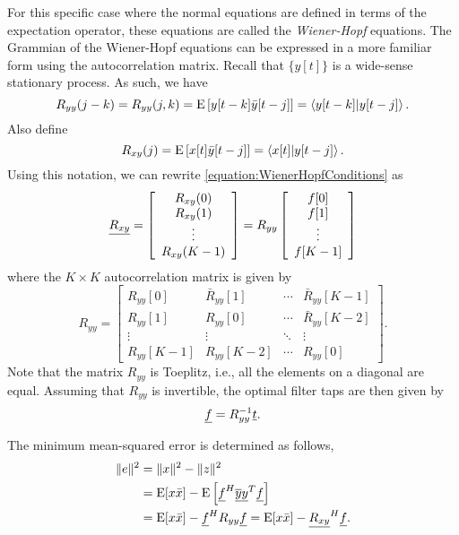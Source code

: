 For this specific case where the normal equations are defined in terms of the expectation operator, these equations are called the \emph{Wiener-Hopf} equations.
The Grammian of the Wiener-Hopf equations can be expressed in a more familiar form using the autocorrelation matrix.
Recall that $\{ y[t] \}$ is a wide-sense stationary process.
As such, we have
\begin{equation*}
R_{yy} (j-k) = R_{yy} (j, k) = \mathrm{E} \left[ y[t-k] \bar{y}[t-j] \right]
= \left\langle y[t-k] | y[t-j] \right\rangle .
\end{equation*}
Also define
\begin{equation*}
R_{xy}(j) = \mathrm{E} \left[ x[t] \bar{y}[t-j] \right]
= \left\langle x[t] | y[t-j] \right\rangle .
\end{equation*}
Using this notation, we can rewrite \eqref{equation:WienerHopfConditions} as
\begin{equation*}
\underline{R_{xy}} = \left[ \begin{array}{c}
R_{xy} (0) \\ R_{xy} (1) \\ \vdots \\ R_{xy} (K-1) \end{array} \right]
= R_{yy}
\left[ \begin{array}{c}
f [0] \\
f [1] \\ \vdots \\
f [K-1] \end{array} \right]
\end{equation*}
where the $K \times K$ autocorrelation matrix is given by
\begin{equation*}
R_{yy} = \left[ \begin{array}{cccc}
R_{yy} [0] & \bar{R}_{yy}[1] & \cdots & \bar{R}_{yy}[K-1] \\
R_{yy} [1] & R_{yy}[0] & \cdots & \bar{R}_{yy}[K-2] \\
\vdots & \vdots & \ddots & \vdots \\
R_{yy} [K-1] & R_{yy}[K-2] & \cdots & R_{yy}[0]
\end{array} \right] .
\end{equation*}
Note that the matrix $R_{yy}$ is Toeplitz, i.e., all the elements on a diagonal are equal.
Assuming that $R_{yy}$ is invertible, the optimal filter taps are then given by
\begin{equation*}
\underline{f} = R_{yy}^{-1} \underline{t}.
\end{equation*}

The minimum mean-squared error is determined as follows,
\begin{equation*}
\begin{split}
\| e \|^2 &= \| x \|^2 - \| z \|^2 \\
&= \mathrm{E} [x \bar{x}] - \mathrm{E} \left[ \underline{f}^H \overline{\underline{y}} \underline{y}^T \underline{f} \right] \\
&= \mathrm{E} [x \bar{x}] - \underline{f}^H R_{yy} \underline{f}
= \mathrm{E} [x \bar{x}] - \underline{R_{xy}}^H \underline{f} .
\end{split}
\end{equation*}






